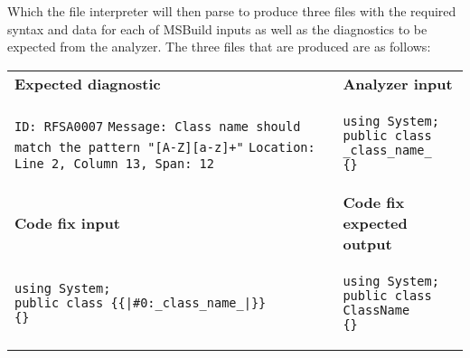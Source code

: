 Which the file interpreter will then parse to produce three files with the required syntax and data for each of MSBuild inputs as well as the diagnostics to be expected from the analyzer. The three files that are produced are as follows:

\begin{table}[h!]
    \centering
    \begin{tabular}{p{9cm}p{8cm}}
        \textbf{Expected diagnostic} & \textbf{Analyzer input} \\
        \texttt{ID: RFSA0007}\newline
        \texttt{Message: Class name should match the pattern "[A-Z][a-z]+"}\newline
        \texttt{Location: Line 2, Column 13, Span: 12}
        &
        \begin{lstlisting}[style=sharpc]
using System;
public class _class_name_
{}
        \end{lstlisting}
        \\
        \textbf{Code fix input} & \textbf{Code fix expected output} \\
        \begin{lstlisting}[style=sharpc]
using System;
public class {{|#0:_class_name_|}}
{}
        \end{lstlisting}
        &
        \begin{lstlisting}[style=sharpc]
using System;
public class ClassName
{}
        \end{lstlisting}
        \\
    \end{tabular}
\end{table}


